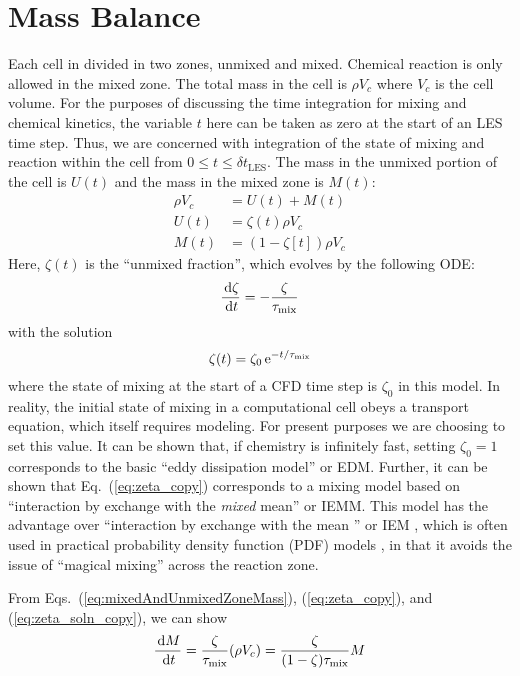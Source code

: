 \section{Mass Balance}
\label{mass_balance_mixing_chem}

Each cell in divided in two zones, unmixed and mixed.  Chemical reaction is only allowed in the mixed zone. The total mass in the cell is $\rho V_c$ where $V_c$ is the cell volume.  For the purposes of discussing the time integration for mixing and chemical kinetics, the variable $t$ here can be taken as zero at the start of an LES time step.  Thus, we are concerned with integration of the state of mixing and reaction within the cell from $0 \le t \le \delta t_{\mathrm{LES}}$.  The mass in the unmixed portion of the cell is $U(t)$ and the mass in the mixed zone is $M(t)$:
\begin{align} \label{eq:mixedAndUnmixedZoneMass}
\rho V_c &= U(t) + M(t) \\
U(t) &= \zeta(t) \rho V_c \\
M(t) &= (1-\zeta[t]) \rho V_c
\end{align}
Here, $\zeta(t)$ is the ``unmixed fraction'', which evolves by the following ODE:
\begin{equation}
\label{eq:zeta_copy}
\frac{\,\mathrm{d} \zeta}{\,\mathrm{d} t}=-\frac{\zeta}{\tau_{\rm mix}}
\end{equation}
with the solution{}
\begin{equation}
\label{eq:zeta_soln_copy}
\zeta(t) = \zeta_0 \,{\rm e}^{-t/\tau_{\rm mix}}
\end{equation}
where the state of mixing at the start of a CFD time step is $\zeta_0$ in this model.  In reality, the initial state of mixing in a computational cell obeys a transport equation, which itself requires modeling.  For present purposes we are choosing to set this value.  It can be shown that, if chemistry is infinitely fast, setting $\zeta_0=1$ corresponds to the basic ``eddy dissipation model'' or EDM.  Further, it can be shown \cite{FDS_Math_Guide} that Eq.~(\ref{eq:zeta_copy}) corresponds to a mixing model based on ``interaction by exchange with the \emph{mixed} mean'' or IEMM.  This model has the advantage over ``interaction by exchange with the mean '' or IEM \cite{Dopazo:1974}, which is often used in practical probability density function (PDF) models \cite{Pope:2000}, in that it avoids the issue of ``magical mixing'' across the reaction zone.

From Eqs.~(\ref{eq:mixedAndUnmixedZoneMass}), (\ref{eq:zeta_copy}), and (\ref{eq:zeta_soln_copy}), we can show
\begin{equation}
\label{eq:mixedzonemasstimederivative}
\frac{\,\mathrm{d} M}{\,\mathrm{d} t}= \frac{\zeta}{\tau_{\rm mix}} (\rho V_c) = \frac{\zeta}{(1-\zeta)\tau_{\rm mix}} M
\end{equation}

